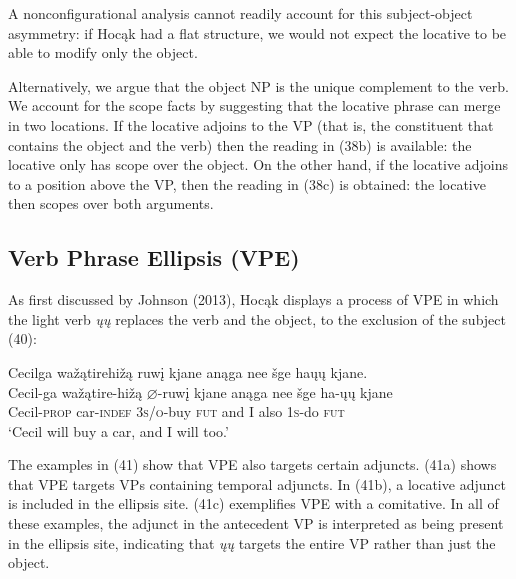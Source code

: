 \documentclass[output=paper]{LSP/langsci}
\begin{document}
A nonconfigurational analysis cannot readily account for this subject-object asymmetry: if Hoc\k{a}k had a flat structure, we would not expect the locative to be able to modify only the object.
	
Alternatively, we argue that the object NP is the unique complement to the verb. We account for the scope facts by suggesting that the locative phrase can merge in two locations. If the locative adjoins to the VP (that is, the constituent that contains the object and the verb) then the reading in (38b) is available: the locative only has scope over the object. On the other hand, if the locative adjoins to a position above the VP, then the reading in (38c) is obtained: the locative then scopes over both arguments.

\subsection{Verb Phrase Ellipsis (VPE)}

As first discussed by Johnson (2013), Hoc\k{a}k displays a process of VPE in which the light verb \textit{\k{u}\k{u}} replaces the verb and the object, to the exclusion of the subject (40):

\begin{exe}
\ex 
\glll Cecilga	wa\v{z}\k{a}tirehi\v{z}\k{a}		ruw\k{i}	kjane		an\k{a}ga	nee		\v{s}ge		ha\k{u}\k{u}			kjane.\\
Cecil-ga	wa\v{z}\k{a}tire-hi\v{z}\k{a}	$\varnothing$-ruw\k{i}		kjane		an\k{a}ga	nee	\v{s}ge ha-\k{u}\k{u}		kjane \\
Cecil-\textsc{prop}		car-\textsc{indef}			\textsc{3s/o}-buy		\textsc{fut}	and	I	also	\textsc{1s}-do	\textsc{fut} \\
\trans `Cecil will buy a car, and I will too.'
\end{exe}

The examples in (41) show that VPE also targets certain adjuncts. (41a) shows that VPE targets VPs containing temporal adjuncts. In (41b), a locative adjunct is included in the ellipsis site. (41c) exemplifies VPE with a comitative. In all of these examples, the adjunct in the antecedent VP is interpreted as being present in the ellipsis site, indicating that \textit{\k{u}\k{u}} targets the entire VP rather than just the object.
\end{document}

